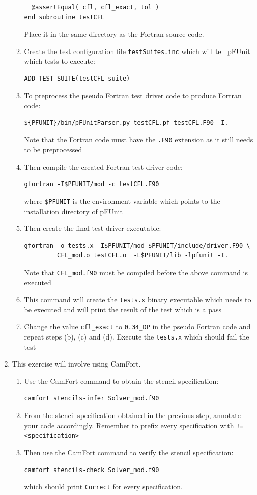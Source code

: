 \documentclass[12pt]{article}
\begin{document}
\begin{enumerate}
\begin{enumerate}
\begin{verbatim}
  @assertEqual( cfl, cfl_exact, tol )
end subroutine testCFL
\end{verbatim}
Place it in the same directory as the Fortran source code.
\item Create the test configuration file \texttt{testSuites.inc} which will tell pFUnit which tests to execute:
\begin{verbatim}
ADD_TEST_SUITE(testCFL_suite)
\end{verbatim}
\item To preprocess the pseudo Fortran test driver code to produce Fortran code:
\begin{verbatim}
${PFUNIT}/bin/pFUnitParser.py testCFL.pf testCFL.F90 -I.
\end{verbatim}
Note that the Fortran code must have the \texttt{.F90} extension as it still needs to be preprocessed
\item Then compile the created Fortran test driver code:
\begin{verbatim}
gfortran -I$PFUNIT/mod -c testCFL.F90
\end{verbatim}
where \texttt{\$PFUNIT} is the environment variable which points to the installation directory of pFUnit
\item Then create the final test driver executable:
\begin{verbatim}
gfortran -o tests.x -I$PFUNIT/mod $PFUNIT/include/driver.F90 \
         CFL_mod.o testCFL.o  -L$PFUNIT/lib -lpfunit -I.
\end{verbatim}
Note that \texttt{CFL\_mod.f90} must be compiled before the above command is executed
\item This command will create the \texttt{tests.x} binary executable which needs to be executed
and will print the result of the test which is a pass
\item Change the value \texttt{cfl\_exact} to \texttt{0.34\_DP} in the pseudo Fortran code and repeat
steps (b), (c) and (d). Execute the \texttt{tests.x} which should fail the test
\end{enumerate}
\item This exercise will involve using CamFort.
\begin{enumerate}
\item Use the CamFort command to obtain the stencil specification:
\begin{verbatim}
camfort stencils-infer Solver_mod.f90
\end{verbatim}
\item From the stencil specification obtained in the previous step, annotate
  your code accordingly. Remember to prefix every specification with
  \texttt{!= <specification>} 
\item Then use the CamFort command to verify the stencil specification:
\begin{verbatim}
camfort stencils-check Solver_mod.f90
\end{verbatim}
which should print \texttt{Correct} for every specification. 
\end{enumerate}
\end{enumerate}
\end{document}
